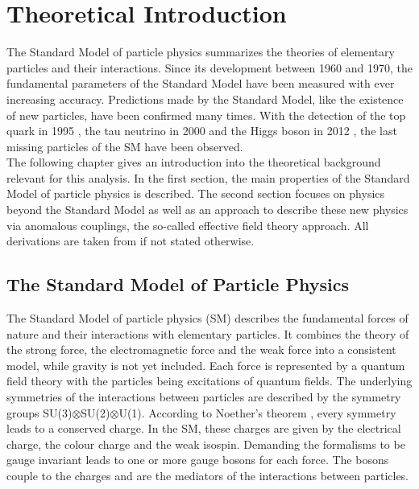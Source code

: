\chapter{Theoretical Introduction}
\label{chap::TheoreticalIntroduction}
The Standard Model of particle physics summarizes the theories of elementary particles and their interactions. Since its development between 1960 and 1970, the fundamental parameters of the Standard Model have been measured with ever increasing accuracy. Predictions made by the Standard Model, like the existence of new particles, have been confirmed many times. With the detection of the top quark in 1995 \cite{top_detection1,top_detection2}, the tau neutrino in 2000 \cite{tau_nu_detection} and the Higgs boson in 2012 \cite{cms_higgsdiscov,atlas_higgsdiscov}, the last missing particles of the SM have been observed.\\

The following chapter gives an introduction into the theoretical background relevant for this analysis. In the first section, the main properties of the Standard Model of particle physics is described. The second section focuses on physics beyond the Standard Model as well as an approach to describe these new physics via anomalous couplings, the so-called effective field theory approach. All derivations are taken from \cite{peskin,mandl} if not stated otherwise.

\section{The Standard Model of Particle Physics}
The Standard Model of particle physics (SM) describes the fundamental forces of nature and their interactions with elementary particles. It combines the theory of the strong force, the electromagnetic force and the weak force into a consistent model, while gravity is not yet included. Each force is represented by a quantum field theory with the particles being excitations of quantum fields. The underlying symmetries of the interactions between particles are described by the symmetry groups SU(3)$\otimes$SU(2)$\otimes$U(1). According to Noether's theorem \cite{noether}, every symmetry leads to a conserved charge. In the SM, these charges are given by the electrical charge, the colour charge and the weak isospin. Demanding the formalisms to be gauge invariant leads to one or more gauge bosons for each force. The bosons couple to the charges and are the mediators of the interactions between particles.\\

